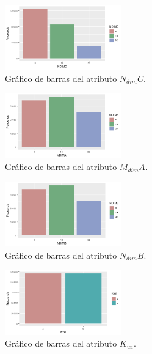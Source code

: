\documentclass[osajnl,twocolumn,showpacs,superscriptaddress,10pt]{revtex4-1} %
\begin{document}
\begin{figure}[H]
    \centering
    \includegraphics[width=0.45\textwidth]{plots/ndimc_bar}
    \caption{Gráfico de barras del atributo $N_{dim}C$.}
    \label{figure:ndimc_bar}
\end{figure}

\begin{figure}[H]
    \centering
    \includegraphics[width=0.45\textwidth]{plots/mdima_bar}
    \caption{Gráfico de barras del atributo $M_{dim}A$.}
    \label{figure:mdima_bar}
\end{figure}

\begin{figure}[H]
    \centering
    \includegraphics[width=0.45\textwidth]{plots/ndimb_bar}
    \caption{Gráfico de barras del atributo $N_{dim}B$.}
    \label{figure:ndimb_bar}
\end{figure}

\begin{figure}[H]
    \centering
    \includegraphics[width=0.45\textwidth]{plots/kwi_bar}
    \caption{Gráfico de barras del atributo $K_{wi}$.}
    \label{figure:kwi_bar}
\end{figure}
\end{document}
